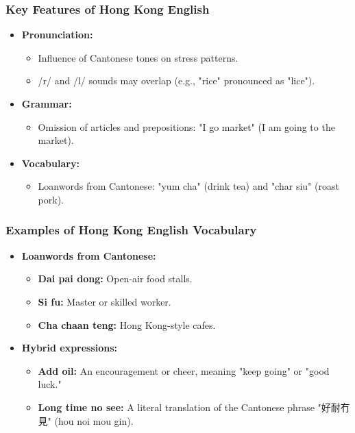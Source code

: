 \documentclass{beamer}
\begin{document}
\begin{frame}
\frametitle{Key Features of Hong Kong English}
\begin{itemize}
    \item \textbf{Pronunciation:}
    \begin{itemize}
        \item Influence of Cantonese tones on stress patterns.
        \item /r/ and /l/ sounds may overlap (e.g., "rice" pronounced as "lice").
    \end{itemize}
    \item \textbf{Grammar:}
    \begin{itemize}
        \item Omission of articles and prepositions: "I go market" (I am going to the market).
    \end{itemize}
    \item \textbf{Vocabulary:}
    \begin{itemize}
        \item Loanwords from Cantonese: "yum cha" (drink tea) and "char siu" (roast pork).
    \end{itemize}
\end{itemize}
\end{frame}

\begin{frame}
\frametitle{Examples of Hong Kong English Vocabulary}
\begin{itemize}
    \item \textbf{Loanwords from Cantonese:}
    \begin{itemize}
        \item \textbf{Dai pai dong:} Open-air food stalls.
        \item \textbf{Si fu:} Master or skilled worker.
        \item \textbf{Cha chaan teng:} Hong Kong-style cafes.
    \end{itemize}
    \item \textbf{Hybrid expressions:}
    \begin{itemize}
        \item \textbf{Add oil:} An encouragement or cheer, meaning "keep going" or "good luck."
        \item \textbf{Long time no see:} A literal translation of the Cantonese phrase "好耐冇見" (hou noi mou gin).
    \end{itemize}
\end{itemize}
\end{frame}
\end{document}

